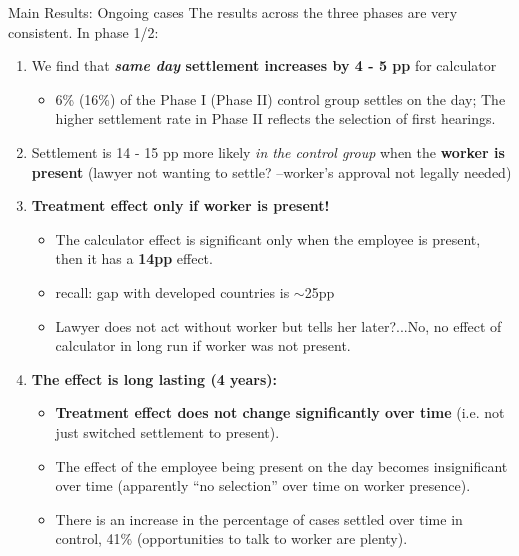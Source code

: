 \documentclass[9pt]{beamer}
\begin{document}
\begin{frame}{Main Results: Ongoing cases}
\label{frame_Main_Results}
The results across the three phases are very consistent. In phase 1/2:
\vspace{.1in}
    \begin{enumerate}
        \item We find that \textbf{\textit{same day} settlement increases by 4 - 5 pp} for calculator 
        \begin{itemize}
            \item 6\% (16\%) of the Phase I (Phase II) control group settles on the day; The higher settlement rate in Phase II reflects the selection of first hearings.
               	\hyperlink{frame_Table3A}{}
               	 \end{itemize}
        \vspace{1mm}
    \pause
    \label{frame_Main_Resultsb}
        \item Settlement is 14 - 15 pp more likely \textit{in the control group} when the \textbf{worker is present} (\alert{lawyer not wanting to settle?} --worker's approval not legally needed)
         \pause
         \vspace{2mm}
        \item \textbf{Treatment effect only if worker is present!}
        \pause
            \begin{itemize}
                \item The calculator effect is significant \alert{only} when the employee is present, then it has a \textbf{14pp} effect. 
        	\hyperlink{frame_Table3B}{}
        	    \item recall: gap with developed countries is $\sim$25pp
        	    \pause
        	    \item \alert{Lawyer does not act without worker but tells her later?}...No, no effect of calculator in long run if worker was not present.
            \end{itemize}
        \pause
        \vspace{2mm}
          \label{frame_Main_Resultsc}
            \item \textbf{The effect is long lasting (4 years):}  
            \pause
         \begin{itemize}
         \vspace{1mm}
             \item  \textbf{Treatment effect does not change significantly over time} (i.e. \alert{not just switched settlement to present}).
             \vspace{1mm}
             \pause
             \item The effect of the employee being present on the day becomes insignificant over time (\alert{apparently ``no selection'' over time on worker presence}). 
             \pause
             \item There is an increase in the percentage of cases settled over time in control, 41\% (\alert{opportunities to talk to worker are plenty}).
             

\end{itemize}
\end{enumerate}
\end{frame}
\end{document}

